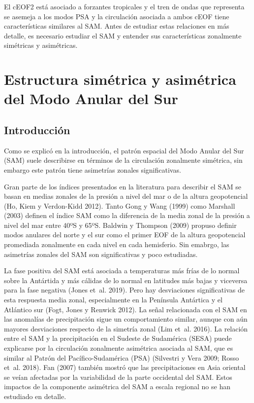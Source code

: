 \documentclass[12pt,oneside,a4paper]{reedthesis}
\begin{document}
El cEOF2 está asociado a forzantes tropicales y el tren de ondas que representa se asemeja a los modos PSA y la circulación asociada a ambos cEOF tiene características similares al SAM.
Antes de estudiar estas relaciones en más detalle, es necesario estudiar el SAM y entender sus características zonalmente simétricas y asimétricas.

\hypertarget{asymsam}{%
\chapter{Estructura simétrica y asimétrica del Modo Anular del Sur}\label{asymsam}}

\hypertarget{introducciuxf3n-1}{%
\section{Introducción}\label{introducciuxf3n-1}}

Como se explicó en la introducción, el patrón espacial del Modo Anular del Sur (SAM) suele describirse en términos de la circulación zonalmente simétrica, sin embargo este patrón tiene asimetrías zonales significativas.

Gran parte de los índices presentados en la literatura para describir el SAM se basan en medias zonales de la presión a nivel del mar o de la altura geopotencial (Ho, Kiem y Verdon-Kidd 2012).
Tanto Gong y Wang (1999) como Marshall (2003) definen el índice SAM como la diferencia de la media zonal de la presión a nivel del mar entre 40ºS y 65ºS.
Baldwin y Thompson (2009) propuso definir modos anulares del norte y el sur como el primer EOF de la altura geopotencial promediada zonalmente en cada nivel en cada hemisferio.
Sin emabrgo, las asimetrías zonales del SAM son significativas y poco estudiadas.

La fase positiva del SAM está asociada a temperaturas más frías de lo normal sobre la Antártida y más cálidas de lo normal en latitudes más bajas y viceversa para la fase negativa (Jones et~al. 2019).
Pero hay desviaciones significativas de esta respuesta media zonal, especialmente en la Península Antártica y el Atlántico sur (Fogt, Jones y Renwick 2012).
La señal relacionada con el SAM en las anomalías de precipitación sigue un comportamiento similar, aunque con aún mayores desviaciones respecto de la simetría zonal (Lim et~al. 2016).
La relación entre el SAM y la precipitación en el Sudeste de Sudamérica (SESA) puede explicarse por la circulación zonalmente asimétrica asociada al SAM, que es similar al Patrón del Pacífico-Sudamérica (PSA) (Silvestri y Vera 2009; Rosso et~al. 2018).
Fan (2007) también mostró que las precipitaciones en Asia oriental se veían afectadas por la variabilidad de la parte occidental del SAM.
Estos impactos de la componente asimétrica del SAM a escala regional no se han estudiado en detalle.
\end{document}
